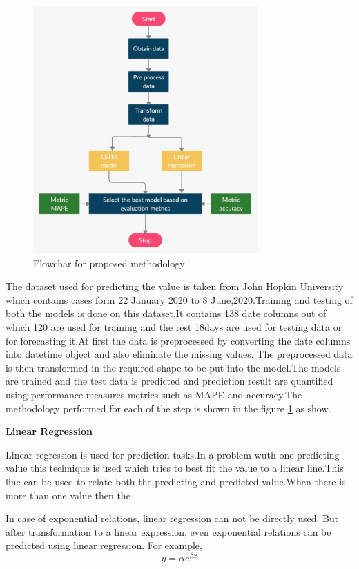 \begin{figure}[!ht]
	  \centering
	  \includegraphics[height=9.5cm]{images/method.jpg}
	  \caption{Flowchar for proposed methodology}
	  \label{fig:method_flow}
\end{figure}



The dataset used for predicting the value is taken from John Hopkin University which
contains cases form 22 January 2020 to 8 June,2020.Training and testing of both the models
is done on this dataset.It contains 138 date columns out of which 120 are used for training
and the rest 18days are used for testing data or for forecasting it.At first the data is preprocessed by converting the date columns into datetime object and also eliminate the
missing values. The preprocessed data is then transformed in the required shape to be put
into the model.The models are trained and the test data is predicted and prediction result
are quantified using performance measures metrics such as MAPE and
accuracy.The methodology performed for each of the step is shown in the figure
\ref{fig:method_flow} as show.


\textbf{Linear Regression}

Linear regression is used for prediction tasks.In a problem wuth one predicting value this
technique is used which tries to best fit the value to a linear line.This line can be used to
relate both the predicting and predicted value.When there is more than one value then the

In case of exponential relations, linear regression can not be directly used.
But after transformation to a linear expression, even exponential relations can
be predicted using linear regression. For example,
\begin{equation}
	y = \alpha e^{\beta x}
\end{equation}

